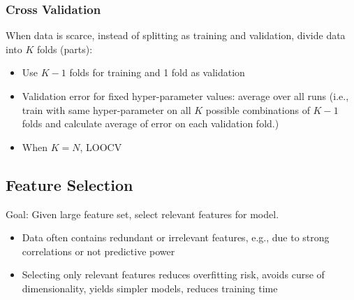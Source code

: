\documentclass[11pt, %
	oneside, %
	english, %
	onehalfspacing, %
	parskip, %
	]{article} %
\theoremstyle{definition}
\begin{document}
\subsubsection*{Cross Validation}

When data is scarce, instead of splitting as training and validation, divide data into $K$ folds (parts):
\begin{itemize}
	\item Use $K-1$ folds for training and 1 fold as validation
	\item Validation error for fixed hyper-parameter values: average over all runs (i.e., train with same hyper-parameter on all $K$ possible combinations of $K-1$ folds and calculate average of error on each validation fold.)
	\item When $K = N$, LOOCV
\end{itemize}


\subsection{Feature Selection}

Goal: Given large feature set, select relevant features for model.

\begin{itemize}
	\item Data often contains redundant or irrelevant features, e.g., due to strong correlations or not predictive power
	\item Selecting only relevant features reduces overfitting risk, avoids curse of dimensionality, yields simpler models, reduces training time
\end{itemize}
\end{document}
